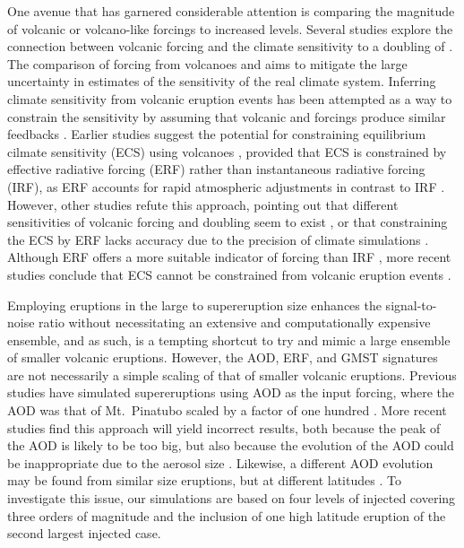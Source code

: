 \documentclass[draft]{agujournal2019}
\begin{document}
  One avenue that has garnered considerable attention is comparing the magnitude of
  volcanic or volcano-like forcings to increased  levels. Several studies
  explore the connection between volcanic forcing and the climate sensitivity to a
  doubling of 
  \cite{boer2007,marvel2016,merlis2014,ollila2016,richardson2019,salvi2022,wigley2005}.
  The comparison of forcing from volcanoes and  aims to mitigate the large
  uncertainty in estimates of the sensitivity of the real climate system. Inferring
  climate sensitivity from volcanic eruption events has been attempted as a way to
  constrain the sensitivity \cite{boer2007} by assuming that volcanic and 
  forcings produce similar feedbacks \cite{pauling2023}. Earlier studies suggest the
  potential for constraining equilibrium cilmate sensitivity (ECS) using volcanoes
  \cite{bender2010}, provided that ECS is constrained by effective radiative forcing
  (ERF) rather than instantaneous radiative forcing (IRF), as ERF accounts for rapid
  atmospheric adjustments in contrast to IRF
  \cite{smith2018,richardson2019,marshall2020}. However, other studies refute this
  approach, pointing out that different sensitivities of volcanic forcing and 
  doubling seem to exist \cite{douglass2006}, or that constraining the ECS by ERF lacks
  accuracy due to the precision of climate simulations \cite{boer2007,salvi2022}.
  Although ERF offers a more suitable indicator of forcing than IRF
  \cite{marvel2016,richardson2019}, more recent studies conclude that ECS cannot be
  constrained from volcanic eruption events \cite{pauling2023}.

   Employing eruptions in the large to supereruption size enhances
  the signal-to-noise ratio without necessitating an extensive and computationally
  expensive ensemble, and as such, is a tempting shortcut to try and mimic a large
  ensemble of smaller volcanic eruptions. However, the AOD, ERF, and GMST signatures are
  not necessarily a simple scaling of that of smaller volcanic eruptions. Previous
  studies have simulated supereruptions using AOD as the input forcing, where the AOD
  was that of Mt.\ Pinatubo scaled by a factor of one hundred \cite{jones2005}. More
  recent studies find this approach will yield incorrect results, both because the peak
  of the AOD is likely to be too big, but also because the evolution of the AOD could be
  inappropriate due to the aerosol size \cite{timmreck2009,timmreck2010}. Likewise, a
  different AOD evolution may be found from similar size eruptions, but at different
  latitudes \cite{schneider2009,marshall2020,zhuo2024}. To investigate this issue, our
  simulations are based on four levels of injected  covering three orders of
  magnitude and the inclusion of one high latitude eruption of the second largest
  injected  case.
\end{document}
